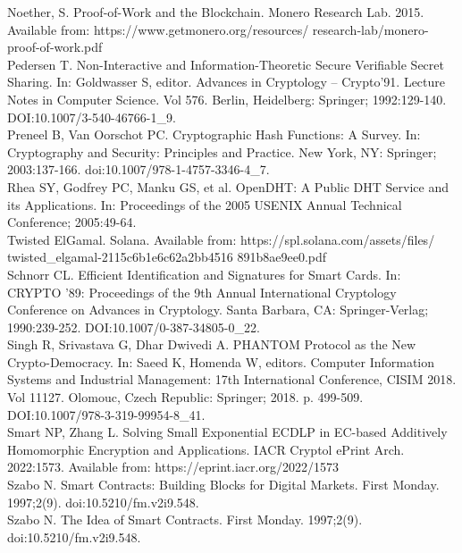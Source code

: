 \documentclass[12pt,a4paper,twocolumn]{article}
\begin{document}
Noether, S. Proof-of-Work and the Blockchain. Monero Research Lab. 2015. Available from: https://www.getmonero.org/resources/
research-lab/monero-proof-of-work.pdf \\

Pedersen T. Non-Interactive and Information-Theoretic Secure Verifiable Secret Sharing. In: Goldwasser S, editor. Advances in Cryptology – Crypto’91. Lecture Notes in Computer Science. Vol 576. Berlin, Heidelberg: Springer; 1992:129-140. DOI:10.1007/3-540-46766-1\_9.\\

Preneel B, Van Oorschot PC. Cryptographic Hash Functions: A Survey. In: Cryptography and Security: Principles and Practice. New York, NY: Springer; 2003:137-166. doi:10.1007/978-1-4757-3346-4\_7.\\

Rhea SY, Godfrey PC, Manku GS, et al. OpenDHT: A Public DHT Service and its Applications. In: Proceedings of the 2005 USENIX Annual Technical Conference; 2005:49-64.\\

Twisted ElGamal. Solana. Available from: https://spl.solana.com/assets/files/ twisted\_elgamal-2115c6b1e6c62a2bb4516 891b8ae9ee0.pdf\\

Schnorr CL. Efficient Identification and Signatures for Smart Cards. In: CRYPTO '89: Proceedings of the 9th Annual International Cryptology Conference on Advances in Cryptology. Santa Barbara, CA: Springer-Verlag; 1990:239-252. DOI:10.1007/0-387-34805-0\_22.\\

Singh R, Srivastava G, Dhar Dwivedi A. PHANTOM Protocol as the New Crypto-Democracy. In: Saeed K, Homenda W, editors. Computer Information Systems and Industrial Management: 17th International Conference, CISIM 2018. Vol 11127. Olomouc, Czech Republic: Springer; 2018. p. 499-509. DOI:10.1007/978-3-319-99954-8\_41.\\

Smart NP, Zhang L. Solving Small Exponential ECDLP in EC-based Additively Homomorphic Encryption and Applications. IACR Cryptol ePrint Arch. 2022:1573. Available from: https://eprint.iacr.org/2022/1573\\

Szabo N. Smart Contracts: Building Blocks for Digital Markets. First Monday. 1997;2(9). doi:10.5210/fm.v2i9.548.\\

Szabo N. The Idea of Smart Contracts. First Monday. 1997;2(9). doi:10.5210/fm.v2i9.548.\\
\end{document}
